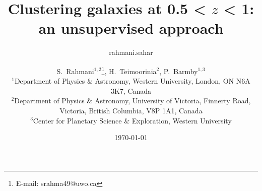 \documentclass[useAMS,usenatbib]{mn2e}
\begin{document}

\title[SOM: classifying high $Z$ galaxies]{Clustering galaxies at 0.5 < $z$ < 1: an unsupervised approach} %
\author{rahmani.sahar }
\date{\today}
\author[S.~Rahmani, H.~Teimoorinia and P.~Barmby]{S.~Rahmani$^{1,2}$\thanks{E-mail:
srahma49@uwo.ca}, H.~Teimoorinia$^{2}$, P.~Barmby$^{1,3}$\\
$^{1}$Department of Physics $\&$ Astronomy, Western University, London, ON N6A 3K7, Canada\\
$^{2}$Department of Physics $\&$ Astronomy, University of Victoria, Finnerty Road, Victoria, British Columbia, V8P 1A1, Canada\\
$^{3}$Center for Planetary Science \& Exploration, Western University}
\maketitle

\end{document}
